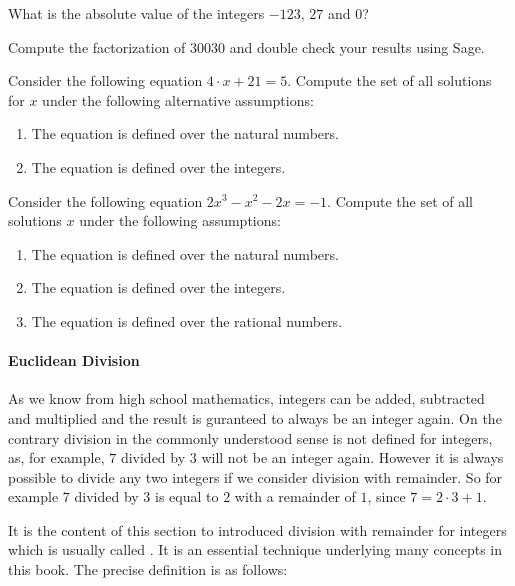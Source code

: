 \begin{exercise}
What is the absolute value of the integers $-123$, $27$ and $0$?
\end{exercise}
\begin{exercise}
Compute the factorization of $30030$ and double check your results using Sage.
\end{exercise}
\begin{exercise}
Consider the following equation $4\cdot x + 21 = 5$. Compute the set of all solutions for $x$ under the following alternative assumptions: 
\begin{enumerate}
\item The equation is defined over the natural numbers. 
\item The equation is defined over the integers.
\end{enumerate}
\end{exercise}
\begin{exercise}
Consider the following equation $2 x^3 - x^2 - 2 x = - 1$. Compute the set of all solutions $x$ under the following assumptions: 
\begin{enumerate}
\item The equation is defined over the natural numbers. 
\item The equation is defined over the integers.
\item The equation is defined over the rational numbers.
\end{enumerate}
\end{exercise}

\paragraph{Euclidean Division}
\label{Euclidean_division}
As we know from high school mathematics, integers can be added, subtracted and multiplied and the result is guranteed to always be an integer again.
On the contrary division in the commonly understood sense is not defined for integers, as, for example, $7$ divided by $3$ will not be an integer again. However it is always possible to divide any two integers if we consider division with remainder. So for example $7$ divided by $3$ is equal to $2$ with a remainder of $1$, since $7 = 2\cdot 3 + 1$. 

It is the content of this section to introduced division with remainder for integers which is usually called . It is an essential technique underlying many concepts in this book. The precise definition is as follows:

